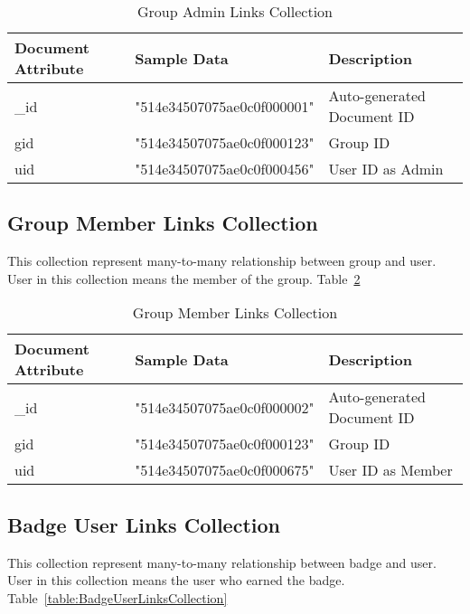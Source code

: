 \begin{table}[H]
\caption{Group Admin Links Collection}\label{table:GroupAdminLinksCollection}
\textbf{ }
\begin{center}
\begin{tabular}{ | l | l |  l | }
\hline
Document Attribute & Sample Data & Description \\ \hline
{\_}id & "514e34507075ae0c0f000001" & Auto-generated Document ID \\ \hline
gid & "514e34507075ae0c0f000123" & Group ID   \\ \hline
uid & "514e34507075ae0c0f000456" & User ID as Admin   \\ \hline
\end{tabular}
\end{center}
\end{table}

\subsection{Group Member Links Collection}
This collection represent many-to-many relationship between group and user. User in this collection means the member of the group. Table~\ref{table:GroupMemberLinksCollection}

\begin{table}[H]
\caption{Group Member Links Collection}\label{table:GroupMemberLinksCollection}
\textbf{ }
\begin{center}
\begin{tabular}{ | l | l |  l | }
\hline
Document Attribute & Sample Data & Description \\ \hline
{\_}id & "514e34507075ae0c0f000002" & Auto-generated Document ID \\ \hline
gid & "514e34507075ae0c0f000123" & Group ID   \\ \hline
uid & "514e34507075ae0c0f000675" & User ID as Member   \\ \hline
\end{tabular}
\end{center}
\end{table}


\subsection{Badge User Links Collection}
This collection represent many-to-many relationship between badge and user. User in this collection means the user who earned the badge. Table~\ref{table:BadgeUserLinksCollection}

